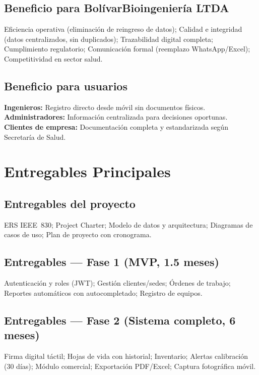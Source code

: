 \documentclass[12pt,a4paper]{article}
\begin{document}
\subsection{Beneficio para BolívarBioingeniería LTDA}

Eficiencia operativa (eliminación de reingreso de datos); Calidad e integridad (datos centralizados, sin duplicados); Trazabilidad digital completa; Cumplimiento regulatorio; Comunicación formal (reemplazo WhatsApp/Excel); Competitividad en sector salud.

\subsection{Beneficio para usuarios}

\textbf{Ingenieros:} Registro directo desde móvil sin documentos físicos. \textbf{Administradores:} Información centralizada para decisiones oportunas. \textbf{Clientes de empresa:} Documentación completa y estandarizada según Secretaría de Salud.

\section{Entregables Principales}

\subsection{Entregables del proyecto}

ERS IEEE~830; Project Charter; Modelo de datos y arquitectura; Diagramas de casos de uso; Plan de proyecto con cronograma.

\subsection{Entregables --- Fase 1 (MVP, 1.5 meses)}

Autenticación y roles (JWT); Gestión clientes/sedes; Órdenes de trabajo; Reportes automáticos con autocompletado; Registro de equipos.

\subsection{Entregables --- Fase 2 (Sistema completo, 6 meses)}

Firma digital táctil; Hojas de vida con historial; Inventario; Alertas calibración (30 días); Módulo comercial; Exportación PDF/Excel; Captura fotográfica móvil.
\end{document}
